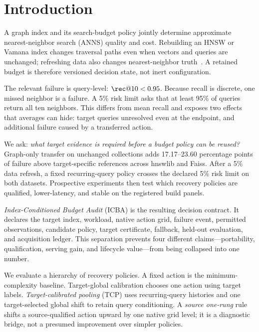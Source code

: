 \section{Introduction}
\label{sec:intro}

A graph index and its search-budget policy jointly determine approximate nearest-neighbor search (ANNS) quality and cost. Rebuilding an HNSW or Vamana index changes traversal paths even when vectors and queries are unchanged; refreshing data also changes nearest-neighbor truth~\cite{malkov2020hnsw,subramanya2019diskann}. A retained budget is therefore versioned decision state, not inert configuration.

The relevant failure is query-level: $\rec@10<0.95$. Because recall is discrete, one missed neighbor is a failure. A 5\% risk limit asks that at least 95\% of queries return all ten neighbors. This differs from mean recall and exposes two effects that averages can hide: target queries unresolved even at the endpoint, and additional failure caused by a transferred action.

We ask: \emph{what target evidence is required before a budget policy can be reused?} Graph-only transfer on unchanged collections adds 17.17--23.60 percentage points of failure above target-specific references across hnswlib and Faiss. After a 5\% data refresh, a fixed recurring-query policy crosses the declared 5\% risk limit on both datasets. Prospective experiments then test which recovery policies are qualified, lower-latency, and stable on the registered build panels.

\emph{Index-Conditioned Budget Audit} (ICBA) is the resulting decision contract. It declares the target index, workload, native action grid, failure event, permitted observations, candidate policy, target certificate, fallback, held-out evaluation, and acquisition ledger. This separation prevents four different claims---portability, qualification, serving gain, and lifecycle value---from being collapsed into one number.

We evaluate a hierarchy of recovery policies. A fixed action is the minimum-complexity baseline. Target-global calibration chooses one action using target labels. \emph{Target-calibrated pooling} (TCP) uses recurring-query histories and one target-selected global shift to retain query conditioning. A \emph{source one-rung} rule shifts a source-qualified action upward by one native grid level; it is a diagnostic bridge, not a presumed improvement over simpler policies.

